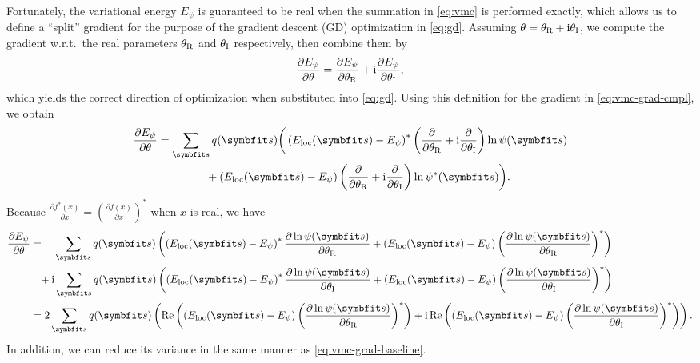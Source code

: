 Fortunately, the variational energy $E_\psi$ is guaranteed to be real when the summation in \cref{eq:vmc} is performed exactly, which allows us to define a ``split'' gradient for the purpose of the gradient descent (GD) optimization in \cref{eq:gd}. Assuming $\theta = {\theta_\text{R}} + \mathrm{i} {\theta_\text{I}}$,  we compute the gradient w.r.t.\ the real parameters ${\theta_\text{R}}$ and ${\theta_\text{I}}$ respectively, then combine them by
\begin{equation}
\frac{\partial E_\psi}{\partial \theta} = \frac{\partial E_\psi}{\partial {\theta_\text{R}}} + \mathrm{i} \frac{\partial E_\psi}{\partial {\theta_\text{I}}},
\end{equation}
which yields the correct direction of optimization when substituted into \cref{eq:gd}. Using this definition for the gradient in \cref{eq:vmc-grad-cmpl}, we obtain
\begin{align}
\frac{\partial E_\psi}{\partial \theta}
&= \sum_\vs q(\vs) \bigg(
\left( E_\text{loc}(\vs) - E_\psi \right)^* \ptri \ln \psi(\vs) \nonumber \\
&\phantom{{}={}} \qquad\quad + \left( E_\text{loc}(\vs) - E_\psi \right) \ptri \ln \psi^*(\vs)
\bigg).
\end{align}
Because $\frac{\partial f^*(x)}{\partial x} = \left( \frac{\partial f(x)}{\partial x} \right)^*$ when $x$ is real, we have
\begin{align}
\frac{\partial E_\psi}{\partial \theta}
&= \phantom{+ \rmi}\!\sum_\vs q(\vs) \left(
\left( E_\text{loc}(\vs) - E_\psi \right)^* \frac{\partial \ln \psi(\vs)}{\partial \thetar}
+ \left( E_\text{loc}(\vs) - E_\psi \right) \left( \frac{\partial \ln \psi(\vs)}{\partial \thetar} \right)^*
\right) \nonumber \\
&\phantom{=} + \rmi \sum_\vs q(\vs) \left(
\left( E_\text{loc}(\vs) - E_\psi \right)^* \frac{\partial \ln \psi(\vs)}{\partial \thetai}
+ \left( E_\text{loc}(\vs) - E_\psi \right) \left( \frac{\partial \ln \psi(\vs)}{\partial \thetai} \right)^*
\right) \\
&= 2 \sum_\vs q(\vs) \left(
\Re\left( \left( E_\text{loc}(\vs) - E_\psi \right) \left( \frac{\partial \ln \psi(\vs)}{\partial \thetar} \right)^* \right)
+ \rmi \Re\left( \left( E_\text{loc}(\vs) - E_\psi \right) \left( \frac{\partial \ln \psi(\vs)}{\partial \thetai} \right)^* \right)
\right). \label{eq:vmc-grad-split}
\end{align}
In addition, we can reduce its variance in the same manner as \cref{eq:vmc-grad-baseline}.

